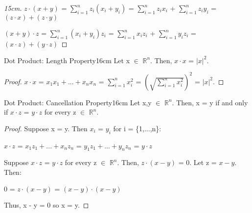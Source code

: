 \begin{enumerate}[label=(\alph*), leftmargin=2cm, itemsep=0.1cm]
            \begin{proof}[15cm]
                $z \cdot (x + y)$
                = $\sum_{i=1}^n z_i(x_i+y_i)$
                = $\sum_{i=1}^n z_ix_i$ + $\sum_{i=1}^n z_iy_i$
                = $(z \cdot x) + (z \cdot y)$

                $(x + y) \cdot z$
                = $\sum_{i=1}^n (x_i+y_i)z_i$
                = $\sum_{i=1}^n x_iz_i$ + $\sum_{i=1}^n y_iz_i$
                = $(x \cdot z) + (y \cdot z)$
            \end{proof}
    \end{enumerate}

    \vspace{0.5cm}



    \begin{wtheorem}{Dot Product: Length Property}{16cm}
        Let x $\in$ $\mathbb{R}^n$. Then, $x \cdot x$ = $|x|^2$.
    \end{wtheorem}

    \begin{proof}
        $x \cdot x$
        = $x_1x_1 + ... + x_nx_n$
        = $\sum_{i=1}^n x_i^2$
        = $(\sqrt{\sum_{i=1}^n x_i^2})^2$
        = $|x|^2$.
    \end{proof}

    \vspace{0.5cm}



    \begin{wtheorem}{Dot Product: Cancellation Property}{16cm}
        Let x,y $\in$ $\mathbb{R}^n$.
        Then, x = y if and only if $x \cdot z$ = $y \cdot z$
        for every z $\in$ $\mathbb{R}^n$.
    \end{wtheorem}

    \begin{proof}
        Suppose x = y. Then $x_i$ = $y_i$ for i = \{1,...,n\}:

        \hspace{0.5cm}
        $x \cdot z$
        = $x_1z_1 + ... + x_nz_n$
        = $y_1z_1 + ... + y_nz_n$
        = $y \cdot z$

        \vspace{0.2cm}

        Suppose $x \cdot z$ = $y \cdot z$ for every z $\in$ $\mathbb{R}^n$.
        Then, $z \cdot (x-y)$ = 0. Let z = $x - y$. Then:

        \hspace{0.5cm}
        0 = $z \cdot (x-y)$
        = $(x-y) \cdot (x-y)$

        Thus, x - y = 0 so x = y.
    \end{proof}

